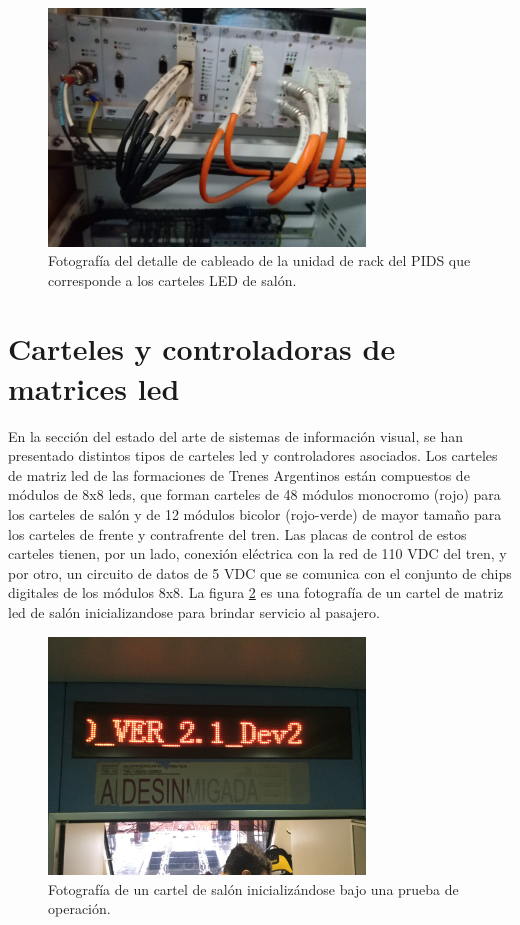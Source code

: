 \begin{figure}[ht]
	\centering
	\includegraphics[width=0.75\textwidth ]{./Figures/rackPIDS2.jpg}
	\caption{Fotografía del detalle de cableado de la unidad de rack del PIDS que corresponde a los carteles LED de salón.}
	\label{fig:rackPIDS2}
\end{figure}

\section{Carteles y controladoras de matrices led}

En la sección del estado del arte de sistemas de información visual, se han presentado distintos tipos de carteles led y controladores asociados. Los carteles de matriz led de las formaciones de Trenes Argentinos están compuestos de módulos de 8x8 leds, que forman carteles de 48 módulos monocromo (rojo) para los carteles de salón y de 12 módulos bicolor (rojo-verde) de mayor tamaño para los carteles de frente y contrafrente del tren. Las placas de control de estos carteles tienen, por un lado, conexión eléctrica con la red de 110 VDC del tren, y por otro, un circuito de datos de 5 VDC que se comunica con el conjunto de chips digitales de los módulos 8x8. La figura \ref{fig:cartelIniciando} es una fotografía de un cartel de matriz led de salón inicializandose para brindar servicio al pasajero.\\

\begin{figure}[ht]
	\centering
	\includegraphics[width=0.75\textwidth]{./Figures/cartelIniciando.JPG}
	\caption{Fotografía de un cartel de salón inicializándose bajo una prueba de operación.}
	\label{fig:cartelIniciando}
\end{figure}
